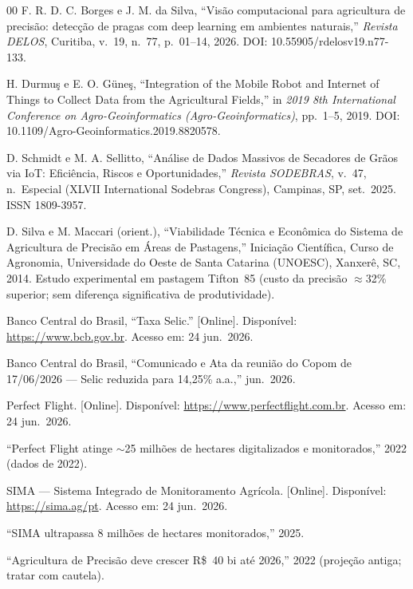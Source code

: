 \documentclass[conference]{IEEEtran}
\begin{document}
\begin{thebibliography}{00}
 F. R. D. C. Borges e J. M. da Silva, ``Visão computacional para agricultura de precisão: detecção de pragas com deep learning em ambientes naturais,'' \textit{Revista DELOS}, Curitiba, v.~19, n.~77, p.~01--14, 2026. DOI: 10.55905/rdelosv19.n77-133.

 H. Durmuş e E. O. Güneş, ``Integration of the Mobile Robot and Internet of Things to Collect Data from the Agricultural Fields,'' in \textit{2019 8th International Conference on Agro-Geoinformatics (Agro-Geoinformatics)}, pp.~1--5, 2019. DOI: 10.1109/Agro-Geoinformatics.2019.8820578.

 D. Schmidt e M. A. Sellitto, ``Análise de Dados Massivos de Secadores de Grãos via IoT: Eficiência, Riscos e Oportunidades,'' \textit{Revista SODEBRAS}, v.~47, n.~Especial (XLVII International Sodebras Congress), Campinas, SP, set.\ 2025. ISSN 1809-3957.

 D. Silva e M. Maccari (orient.), ``Viabilidade Técnica e Econômica do Sistema de Agricultura de Precisão em Áreas de Pastagens,'' Iniciação Científica, Curso de Agronomia, Universidade do Oeste de Santa Catarina (UNOESC), Xanxerê, SC, 2014. Estudo experimental em pastagem Tifton~85 (custo da precisão $\approx$32\% superior; sem diferença significativa de produtividade).

 Banco Central do Brasil, ``Taxa Selic.'' [Online]. Disponível: \url{https://www.bcb.gov.br}. Acesso em: 24 jun.\ 2026.

 Banco Central do Brasil, ``Comunicado e Ata da reunião do Copom de 17/06/2026 --- Selic reduzida para 14,25\% a.a.,'' jun.\ 2026.

 Perfect Flight. [Online]. Disponível: \url{https://www.perfectflight.com.br}. Acesso em: 24 jun.\ 2026.

 ``Perfect Flight atinge $\sim$25 milhões de hectares digitalizados e monitorados,'' 2022 (dados de 2022). %

 SIMA --- Sistema Integrado de Monitoramento Agrícola. [Online]. Disponível: \url{https://sima.ag/pt}. Acesso em: 24 jun.\ 2026.

 ``SIMA ultrapassa 8 milhões de hectares monitorados,'' 2025. %

 ``Agricultura de Precisão deve crescer R\$~40 bi até 2026,'' 2022 (projeção antiga; tratar com cautela).


\end{thebibliography}
\end{document}
